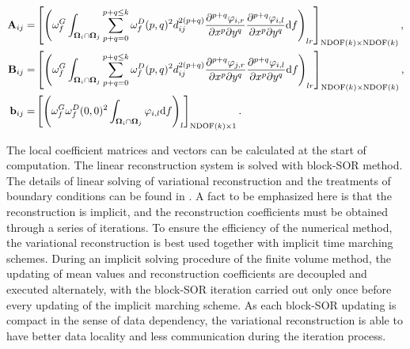 \begin{equation}
    \label{eq:vrCoeffs}
    \begin{aligned}
        \mathbf{A}_{ij} = &
        \left[
            \left({
                \omega_f^G\int_{\OO_i \cap \OO_j}{
                    \sum_{p+q=0}^{p + q\leq k}
                    \omega_f^D(p,q)^2
                    d_{ij}^{2(p+q)}
                    \partialderivative{^{p+q}\varphi_{i,r}}{x^p\partial y^q}
                    \partialderivative{^{p+q}\varphi_{i,l}}{x^p\partial y^q}
                    \dd f}
            }\right)_{lr}
        \right]_{\mathrm{NDOF}(k) \times \mathrm{NDOF}(k)}, \\
        \mathbf{B}_{ij}=  &
        \left[
            \left({
                \omega_f^G\int_{\OO_i \cap \OO_j}{
                    \sum_{p+q=0}^{p + q\leq k}
                    \omega_f^D(p,q)^2
                    d_{ij}^{2(p+q)}
                    \partialderivative{^{p+q}\varphi_{j,r}}{x^p\partial y^q}
                    \partialderivative{^{p+q}\varphi_{i,l}}{x^p\partial y^q}
                    \dd f}
            }\right)_{lr}
        \right]_{\mathrm{NDOF}(k) \times \mathrm{NDOF}(k)}, \\
        \mathbf{b}_{ij}=  &
        \left[
            \left({
                    \omega_f^G\omega_f^D(0,0)^2
                    \int_{\OO_i \cap \OO_j}{
                        \varphi_{i,l}
                        \dd f}
                }\right)_{l}
        \right]_{\mathrm{NDOF}(k) \times 1}.                \\
    \end{aligned}
\end{equation}

The local coefficient matrices and vectors  can be
calculated at the start of computation.
The linear reconstruction system 
is solved with block-SOR method.
The details of linear solving of variational reconstruction and the treatments of
boundary conditions can be found in \cite{wang2017compact_VR}.
A fact to be emphasized here is that
the reconstruction is implicit, and
the reconstruction coefficients must be
obtained through a series of
iterations.
To ensure the efficiency of the numerical method,
the variational reconstruction is best used
together with implicit time marching schemes.
During an implicit solving procedure of the finite volume method,
the updating of mean values and reconstruction
coefficients are decoupled
and executed alternately, with the block-SOR
iteration carried out only once before every updating
of the implicit marching scheme.
As each block-SOR updating is compact in the sense of data dependency,
the variational reconstruction is able to have better data locality and
less communication during the iteration process.



